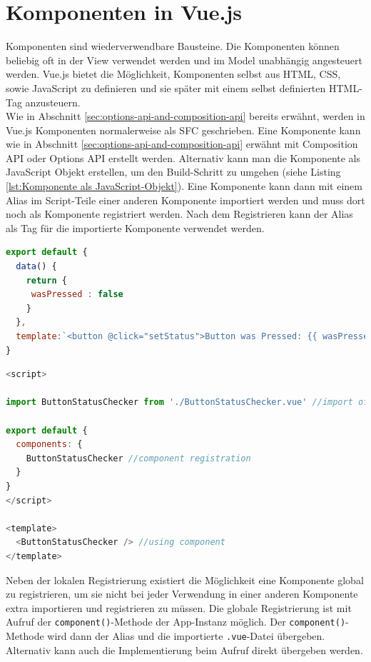 \section{Komponenten in Vue.js}\label{sec:komponenten-in-vue.js}
Komponenten sind wiederverwendbare Bausteine.
Die Komponenten können beliebig oft in der View verwendet werden und im Model unabhängig angesteuert werden.
Vue.js bietet die Möglichkeit, Komponenten selbst aus HTML, CSS, sowie JavaScript zu definieren und sie später mit einem
selbst  definierten HTML-Tag anzusteuern. \cite[S. 11-12]{steyer2019}
\\
Wie in Abschnitt \ref{sec:options-api-and-composition-api} bereits erwähnt, werden in Vue.js Komponenten normalerweise als SFC geschrieben.
Eine Komponente kann wie in Abschnitt \ref{sec:options-api-and-composition-api} erwähnt mit Composition API oder Options API
erstellt werden.
Alternativ kann man die Komponente als JavaScript Objekt erstellen, um den Build-Schritt zu umgehen (siehe Listing \ref{lst:Komponente als JavaScript-Objekt}).
Eine Komponente kann dann mit einem Alias im Script-Teile einer anderen Komponente importiert werden und muss dort noch als Komponente
registriert werden.
Nach dem Registrieren kann der Alias als Tag für die importierte Komponente verwendet werden. \cite{vueComponents}

\newpage

\begin{lstlisting}[caption={Komponente als JavaScript Objekt},language=javascript,label={lst:Komponente als JavaScript-Objekt}]
export default {
  data() {
    return {
     wasPressed : false
    }
  },
  template:`<button @click="setStatus">Button was Pressed: {{ wasPressed }}</button>`
}
\end{lstlisting}


\begin{lstlisting}[caption={Verwendung einer Komponente},language=javascript,label={lst:Verwendung einer Komponente}]
<script>

import ButtonStatusChecker from './ButtonStatusChecker.vue' //import of component

export default {
  components: {
    ButtonStatusChecker //component registration
  }
}
</script>

<template>
  <ButtonStatusChecker /> //using component
</template>
\end{lstlisting}

Neben der lokalen Registrierung existiert die Möglichkeit eine Komponente global
zu registrieren, um sie nicht bei jeder Verwendung in einer anderen Komponente
extra importieren und registrieren zu müssen.
Die globale Registrierung ist mit Aufruf der \texttt{component()}-Methode der App-Instanz möglich.
Der \texttt{component()}-Methode wird dann der Alias und die importierte \texttt{.vue}-Datei übergeben.
Alternativ kann auch die Implementierung beim Aufruf direkt übergeben werden. \cite{vueComponentsRegistration}

